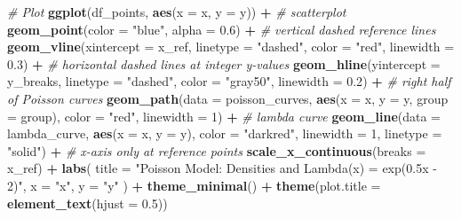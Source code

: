 \documentclass[
]{book}
\newenvironment{Shaded}{\begin{snugshade}}{\end{snugshade}}
\newcommand{\AttributeTok}[1]{\textcolor[rgb]{0.13,0.29,0.53}{#1}}
\newcommand{\CommentTok}[1]{\textcolor[rgb]{0.56,0.35,0.01}{\textit{#1}}}
\newcommand{\DecValTok}[1]{\textcolor[rgb]{0.00,0.00,0.81}{#1}}
\newcommand{\FloatTok}[1]{\textcolor[rgb]{0.00,0.00,0.81}{#1}}
\newcommand{\FunctionTok}[1]{\textcolor[rgb]{0.13,0.29,0.53}{\textbf{#1}}}
\newcommand{\NormalTok}[1]{#1}
\newcommand{\SpecialCharTok}[1]{\textcolor[rgb]{0.81,0.36,0.00}{\textbf{#1}}}
\newcommand{\StringTok}[1]{\textcolor[rgb]{0.31,0.60,0.02}{#1}}
\begin{document}
\begin{Shaded}
\begin{Highlighting}[]
\CommentTok{\# Plot}
\FunctionTok{ggplot}\NormalTok{(df\_points, }\FunctionTok{aes}\NormalTok{(}\AttributeTok{x =}\NormalTok{ x, }\AttributeTok{y =}\NormalTok{ y)) }\SpecialCharTok{+}
  \CommentTok{\# scatterplot}
  \FunctionTok{geom\_point}\NormalTok{(}\AttributeTok{color =} \StringTok{"blue"}\NormalTok{, }\AttributeTok{alpha =} \FloatTok{0.6}\NormalTok{) }\SpecialCharTok{+}
  \CommentTok{\# vertical dashed reference lines}
  \FunctionTok{geom\_vline}\NormalTok{(}\AttributeTok{xintercept =}\NormalTok{ x\_ref, }\AttributeTok{linetype =} \StringTok{"dashed"}\NormalTok{, }
             \AttributeTok{color =} \StringTok{"red"}\NormalTok{, }\AttributeTok{linewidth =} \FloatTok{0.3}\NormalTok{) }\SpecialCharTok{+}
  \CommentTok{\# horizontal dashed lines at integer y{-}values}
  \FunctionTok{geom\_hline}\NormalTok{(}\AttributeTok{yintercept =}\NormalTok{ y\_breaks, }\AttributeTok{linetype =} \StringTok{"dashed"}\NormalTok{, }
             \AttributeTok{color =} \StringTok{"gray50"}\NormalTok{, }\AttributeTok{linewidth =} \FloatTok{0.2}\NormalTok{) }\SpecialCharTok{+}
  \CommentTok{\# right half of Poisson curves}
  \FunctionTok{geom\_path}\NormalTok{(}\AttributeTok{data =}\NormalTok{ poisson\_curves, }\FunctionTok{aes}\NormalTok{(}\AttributeTok{x =}\NormalTok{ x, }\AttributeTok{y =}\NormalTok{ y, }\AttributeTok{group =}\NormalTok{ group),}
            \AttributeTok{color =} \StringTok{"red"}\NormalTok{, }\AttributeTok{linewidth =} \DecValTok{1}\NormalTok{) }\SpecialCharTok{+}
  \CommentTok{\# lambda curve}
  \FunctionTok{geom\_line}\NormalTok{(}\AttributeTok{data =}\NormalTok{ lambda\_curve, }\FunctionTok{aes}\NormalTok{(}\AttributeTok{x =}\NormalTok{ x, }\AttributeTok{y =}\NormalTok{ y),}
            \AttributeTok{color =} \StringTok{"darkred"}\NormalTok{, }\AttributeTok{linewidth =} \DecValTok{1}\NormalTok{, }\AttributeTok{linetype =} \StringTok{"solid"}\NormalTok{) }\SpecialCharTok{+}
  \CommentTok{\# x{-}axis only at reference points}
  \FunctionTok{scale\_x\_continuous}\NormalTok{(}\AttributeTok{breaks =}\NormalTok{ x\_ref) }\SpecialCharTok{+}
  \FunctionTok{labs}\NormalTok{(}
    \AttributeTok{title =} \StringTok{"Poisson Model: Densities and Lambda(x) = exp(0.5x {-} 2)"}\NormalTok{,}
    \AttributeTok{x =} \StringTok{"x"}\NormalTok{,}
    \AttributeTok{y =} \StringTok{"y"}
\NormalTok{  ) }\SpecialCharTok{+}
  \FunctionTok{theme\_minimal}\NormalTok{() }\SpecialCharTok{+}
  \FunctionTok{theme}\NormalTok{(}\AttributeTok{plot.title =} \FunctionTok{element\_text}\NormalTok{(}\AttributeTok{hjust =} \FloatTok{0.5}\NormalTok{))}
\end{Highlighting}
\end{Shaded}
\end{document}
